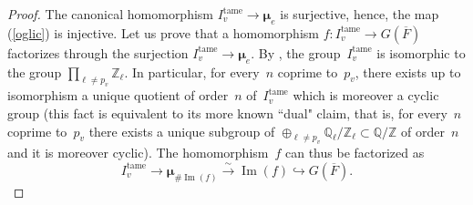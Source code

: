 \documentclass[a4paper,english,12pt]{amsart}
\newcommand{\QQ}{\mathbb{Q}}
\newcommand{\oF}{\overline F}
\newcommand{\ZZ}{\mathbb{Z}}
\newcommand{\doots}{,\dots ,}
\newcommand{\muup}{\widehat{\muu}_v ^{(p)}}
\newcommand{\muu}{\boldsymbol{\mu}}
\DeclareMathOperator{\Imm}{Im}
\DeclareMathOperator{\tame}{{tame}}
\def\no{n\textsuperscript{0}\,}
\numberwithin{equation}{subsection}
\begin{document}
\begin{proof}
The canonical homomorphism $I_v^{\tame}\to\muu_e$ is surjective, hence, the map (\ref{oglic}) is injective. Let us prove that a homomorphism $f:I_v^{\tame}\to G(\overline F)$ factorizes through the surjection $I_v^{\tame}\to\muu_e$.  By \cite[Page 410]{CohomologyNF}, the group~$I_v^{\tame}$ is isomorphic to the group $\prod_{\ell\neq p_v}\ZZ_{\ell}$. In particular, for every~$n$ coprime to~$p_v$, there exists up to isomorphism a unique quotient of order~$n$ of~$I_v^{\tame}$ which is moreover a cyclic group (this fact is equivalent to its more known ``dual" claim, that is, for every~$n$ coprime to~$p_v$ there exists a unique subgroup of $\oplus_{\ell\neq p_v}\QQ_{\ell}/\ZZ_{\ell}\subset\QQ/\ZZ$ of order~$n$ and it is moreover cyclic). %
The homomorphism~$f$ can thus be factorized as $$I_v^{\tame} \to \muu_{\#\Imm(f)}\xrightarrow{\sim}\Imm(f)\hookrightarrow G(\overline F).$$ %

\end{proof}
\end{document}
